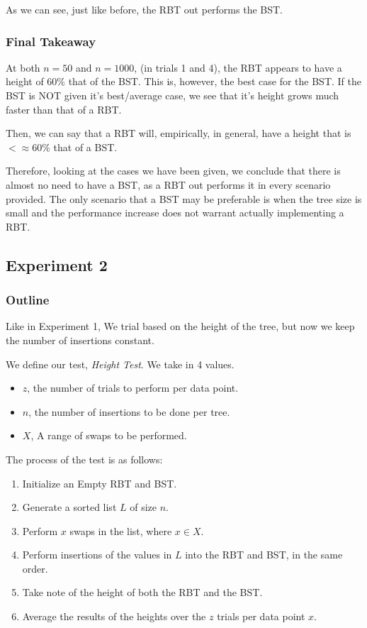 \documentclass{article}
\begin{document}
As we can see, just like before, the RBT out performs the BST.

\subsubsection{Final Takeaway}

At both $n=50$ and $n=1000$, (in trials 1 and 4), the RBT appears to have a height of $60\%$ that of the BST. This is, however, the best case for the BST. If the BST is NOT given it's best/average case, we see that it's height grows much faster than that of a RBT.

Then, we can say that a RBT will, empirically, in general, have a height that is $< \approx 60\%$ that of a BST.

Therefore, looking at the cases we have been given, we conclude that there is almost no need to have a BST, as a RBT out performs it in every scenario provided. The only scenario that a BST may be preferable is when the tree size is small and the performance increase does not warrant actually implementing a RBT.

\newpage
\subsection{Experiment 2}

\subsubsection{Outline}

Like in Experiment 1, We trial based on the height of the tree, but now we keep the number of insertions constant.

We define our test, \textit{Height Test}. We take in 4 values.
\begin{itemize}
    \item $z$, the number of trials to perform per data point.
    \item $n$, the number of insertions to be done per tree.
    \item $X$, A range of swaps to be performed.
\end{itemize}

The process of the test is as follows:

\begin{enumerate}
    \item Initialize an Empty RBT and BST.
    \item Generate a sorted list $L$ of size $n$.
    \item Perform $x$ swaps in the list, where $x \in X$.
    \item Perform insertions of the values in $L$ into the RBT and BST, in the same order.
    \item Take note of the height of both the RBT and the BST.
    \item Average the results of the heights over the $z$ trials per data point $x$.
\end{enumerate}
\end{document}
